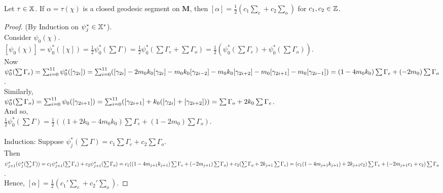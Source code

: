 \documentclass[a4paper, 11pt]{article}
\def\bM{\mathbf{M}}
\begin{document}
\begin{lem}
Let $\tau\in\mathbb{X}$. If $\alpha=\tau(\chi)$ is a closed geodesic segment on $\bM$, then $[\alpha]=\frac{1}{2}(c_1\sum_e+c_2\sum_o)$ for $c_1,c_2\in\mathbb{Z}$.
\begin{proof}(By Induction on $\psi^*_j\in\mathbb{X}^*$).\\
Consider $\psi_0(\chi)$.\\
$[\psi_0(\chi)]=\psi_0^*([\chi])=\frac{1}{2}\psi_0^*(\sum\Gamma)=\frac{1}{2}\psi_0^*(\sum\Gamma_e+\sum\Gamma_o)=\frac{1}{2}(\psi_0^*(\sum\Gamma_e)+\psi_0^*(\sum\Gamma_o))$. \\Now $\psi_0^*(\sum\Gamma_e)\\=\sum_{i=0}^{11}\psi_0^*([\gamma_{2i}])\\=\sum_{i=0}^{11}( [\gamma_{2i}]-2m_0k_0[\gamma_{2i}]-m_0k_0[\gamma_{2i-2}] -m_0k_0[\gamma_{2i+2}]-m_0[\gamma_{2i+1}]-m_0[\gamma_{2i-1}] )\\=(1-4m_0k_0)\sum\Gamma_e+(-2m_0)\sum\Gamma_o$.\\
Similarly,\\ $\psi_0^*(\sum\Gamma_o)\\=\sum_{i=0}^{11}\psi_0([\gamma_{2i+1}])=\sum_{i=0}^{11}([\gamma_{2i+1}] +k_0([\gamma_{2i}]+[\gamma_{2i+2}]))\\=\sum\Gamma_o+2k_0\sum\Gamma_e$.\\
And so,\\ $\frac{1}{2}\psi_0^*(\sum\Gamma)=\frac{1}{2}((1+2k_0-4m_0k_0)\sum\Gamma_e +(1-2m_0)\sum\Gamma_o )$.\\\\
Induction: Suppose $\psi^*_j(\sum\Gamma)=c_1\sum\Gamma_e+c_2\sum\Gamma_o$.\\
Then $\psi^*_{j+1}(\psi^*_{j}(\sum\Gamma))\\=c_1\psi^*_{j+1}(\sum\Gamma_e)+c_2\psi^*_{j+1}(\sum\Gamma_o)\\=
c_1((1-4m_{j+1}k_{j+1})\sum\Gamma_e+(-2m_{j+1})\sum\Gamma_o)+c_2(\sum\Gamma_o+2k_{j+1}\sum\Gamma_e)\\=
(c_1(1-4m_{j+1}k_{j+1}) + 2k_{j+1}c_2)\sum\Gamma_e+(-2m_{j+1}c_1+c_2)\sum\Gamma_o$.\\
Hence, $[\alpha]=\frac{1}{2}(c_1'\sum_e+c_2'\sum_o)$.

\end{proof}
\end{lem}
\end{document}
